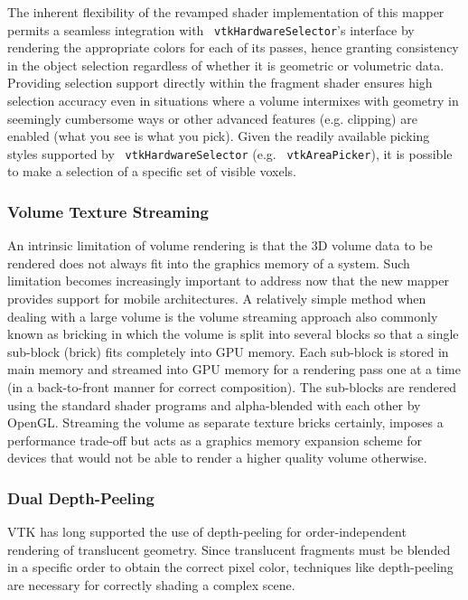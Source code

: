 The inherent flexibility of the revamped shader implementation of this mapper permits a seamless integration with ~\texttt{vtkHardwareSelector}'s interface by rendering the appropriate colors for each of its passes, hence granting consistency in the object selection regardless of whether it is geometric or volumetric data.  Providing selection support directly within the fragment shader ensures high selection accuracy even in situations where a volume intermixes with geometry in seemingly cumbersome ways or other advanced features (e.g. clipping) are enabled (what you see is what you pick).  Given the readily available picking styles supported by ~\texttt{vtkHardwareSelector} (e.g. ~\texttt{vtkAreaPicker}), it is possible to make a selection of a specific set of visible voxels.

\subsubsection{Volume Texture Streaming}
An intrinsic limitation of volume rendering is that the 3D volume data to be rendered does not always fit into the graphics memory of a system. Such limitation becomes increasingly important to address now that the new mapper provides support for mobile architectures.
A relatively simple method when dealing with a large volume is the volume streaming approach also commonly known as bricking in which the volume is split into several blocks so that a single sub-block (brick) fits completely into GPU memory.  Each sub-block is stored in main memory and streamed into GPU memory for a rendering pass one at a time (in a back-to-front manner for correct composition). The sub-blocks are rendered using the standard shader programs and alpha-blended with each other by OpenGL. Streaming the volume as separate texture bricks certainly, imposes a performance trade-off but acts as a graphics memory expansion scheme for devices that would not be able to render a higher quality volume otherwise.

\subsubsection{Dual Depth-Peeling}

VTK has long supported the use of depth-peeling for order-independent
rendering of translucent geometry. Since translucent fragments must be
blended in a specific order to obtain the correct pixel color,
techniques like depth-peeling are necessary for correctly shading a
complex scene.

